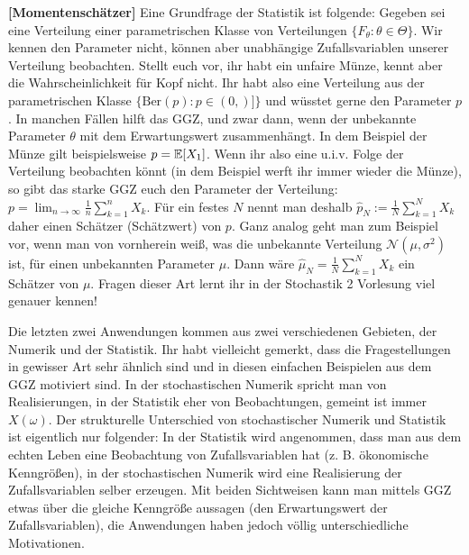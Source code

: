 \begin{anwendung}\label{PS}
 \textbf{[Momentensch\"atzer]}
Eine Grundfrage der Statistik ist folgende: Gegeben sei eine Verteilung einer parametrischen Klasse von Verteilungen $\{F_\theta: \theta \in \Theta\}$. Wir kennen den Parameter nicht, k\"onnen aber unabh\"angige Zufallsvariablen unserer Verteilung beobachten. Stellt euch vor, ihr habt ein unfaire M\"unze, kennt aber die Wahrscheinlichkeit f\"ur Kopf nicht. Ihr habt also eine Verteilung aus der parametrischen Klasse $\{\text{Ber}(p): p\in (0,)]\}$ und w\"usstet gerne den Parameter $p$. In manchen F\"allen hilft das GGZ, und zwar dann, wenn der unbekannte Parameter $\theta$ mit dem Erwartungswert zusammenh\"angt. In dem Beispiel der M\"unze gilt beispielsweise $p=\mathbb{E}[X_1]$. Wenn ihr also eine u.i.v. Folge der Verteilung beobachten k\"onnt (in dem Beispiel werft ihr immer wieder die M\"unze), so gibt das starke GGZ euch den Parameter der Verteilung: $p=\lim_{n\to\infty} \frac{1}{n} \sum_{k=1}^n X_k$. F\"ur ein festes $N$ nennt man deshalb $\hat{p}_N:=\frac{1}{N}\sum_{k=1}^N X_k$ daher einen Sch\"atzer (Sch\"atzwert) von $p$. Ganz analog geht man zum Beispiel vor, wenn man von vornherein wei\ss, was die unbekannte Verteilung $\mathcal N(\mu,\sigma^2)$ ist, f\"ur einen unbekannten Parameter $\mu$. Dann w\"are $\hat \mu_N=\frac{1}{N}\sum_{k=1}^N X_k$ ein Sch\"atzer von $\mu$. Fragen dieser Art lernt ihr in der Stochastik 2 Vorlesung viel genauer kennen!
\end{anwendung}
Die letzten zwei Anwendungen kommen aus zwei verschiedenen Gebieten, der Numerik und der Statistik. Ihr habt vielleicht gemerkt, dass die Fragestellungen in gewisser Art sehr \"ahnlich sind und in diesen einfachen Beispielen aus dem GGZ motiviert sind. In der stochastischen Numerik spricht man von Realisierungen, in der Statistik eher von Beobachtungen, gemeint ist immer $X(\omega)$.
Der strukturelle Unterschied von stochastischer Numerik und Statistik ist eigentlich nur folgender: In der Statistik wird angenommen, dass man aus dem echten Leben eine Beobachtung von Zufallsvariablen hat (z. B. \"okonomische Kenngr\"o\ss en), in der stochastischen Numerik wird eine Realisierung der Zufallsvariablen selber erzeugen. Mit beiden Sichtweisen kann man mittels GGZ etwas \"uber die gleiche Kenngr\"o\ss e aussagen (den Erwartungswert der Zufallsvariablen), die Anwendungen haben jedoch v\"ollig unterschiedliche Motivationen. 
